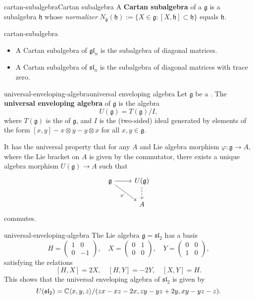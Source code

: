\begin{topic}{cartan-subalgebra}{Cartan subalgebra}
    A \textbf{Cartan subalgebra} of a  $\mathfrak{g}$ is a  subalgebra $\mathfrak{h}$ whose \textit{normalizer} $N_\mathfrak{g}(\mathfrak{h}) := \{ X \in \mathfrak{g} : [X, \mathfrak{h}] \subset \mathfrak{h} \}$ equals $\mathfrak{h}$.
\end{topic}

\begin{example}{cartan-subalgebra}
    \begin{itemize}
        \item A Cartan subalgebra of $\mathfrak{gl}_n$ is the subalgebra of diagonal matrices.
        \item A Cartan subalgebra of $\mathfrak{sl}_n$ is the subalgebra of diagonal matrices with trace zero.
    \end{itemize}
\end{example}

\begin{topic}{universal-enveloping-algebra}{universal enveloping algebra}
    Let $\mathfrak{g}$ be a . The \textbf{universal enveloping algebra} of $\mathfrak{g}$ is the algebra
    \[ U(\mathfrak{g}) = T(\mathfrak{g}) / I , \]
    where $T(\mathfrak{g})$ is the  of $\mathfrak{g}$, and $I$ is the (two-sided) ideal generated by elements of the form $[x, y] - x \otimes y - y \otimes x$ for all $x, y \in \mathfrak{g}$.
    
    It has the universal property that for any  $A$ and Lie algebra morphism $\varphi : \mathfrak{g} \to A$, where the Lie bracket on $A$ is given by the commutator, there exists a unique algebra morphism $U(\mathfrak{g}) \to A$ such that
    \[ \begin{tikzcd} \mathfrak{g} \arrow{r} \arrow[swap]{dr}{\varphi} & U(\mathfrak{g}) \arrow[dashed]{d} \\ & A \end{tikzcd} \]
    commutes.
\end{topic}

\begin{example}{universal-enveloping-algebra}
    The Lie algebra $\mathfrak{g} = \mathfrak{sl}_2$ has a basis
    \[ H = \begin{pmatrix} 1 & 0 \\ 0 & -1 \end{pmatrix}, \quad X = \begin{pmatrix} 0 & 1 \\ 0 & 0 \end{pmatrix}, \quad Y = \begin{pmatrix} 0 & 0 \\ 1 & 0 \end{pmatrix} , \]
    satisfying the relations
    \[ [H, X] = 2X, \quad [H, Y] = -2Y, \quad [X, Y] = H . \]
    This shows that the universal enveloping algebra of $\mathfrak{sl}_2$ is given by
    \[ U(\mathfrak{sl}_2) = \mathbb{C} \langle x, y, z \rangle / (zx - xz - 2x, zy - yz + 2y, xy - yz - z) . \]
\end{example}

